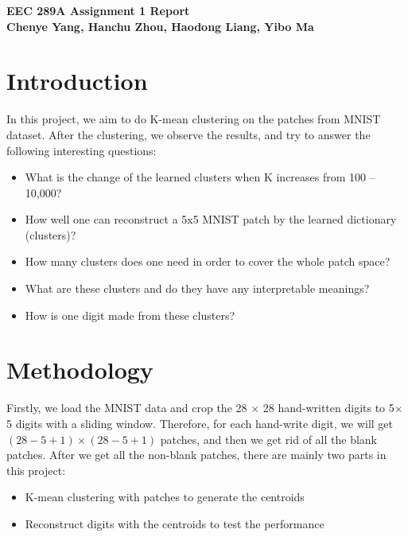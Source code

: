 \documentclass{article}
\begin{document}
\noindent
\textbf{\large EEC 289A Assignment 1 Report} \\
\textbf{\small Chenye Yang, Hanchu Zhou, Haodong Liang, Yibo Ma}


\vspace{2mm}

\section{Introduction}

In this project, we aim to do K-mean clustering on the patches from MNIST dataset. After the clustering, we observe the results, and try to answer the following interesting questions:

\begin{itemize}
    \item What is the change of the learned clusters when K increases from 100 – 10,000?
    \item How well one can reconstruct a 5x5 MNIST patch by the learned dictionary (clusters)?
    \item How many clusters does one need in order to cover the whole patch space?
    \item What are these clusters and do they have any interpretable meanings?
    \item How is one digit made from these clusters?
\end{itemize}

\vspace{2mm}

\section{Methodology}

Firstly, we load the MNIST data and crop the 28 $\times$ 28 hand-written digits to 5$\times$ 5 digits with a sliding window. Therefore, for each hand-write digit, we will get $(28 -5 +1) \times (28 - 5 + 1)$ patches, and then we get rid of all the blank patches. After we get all the non-blank patches, there are mainly two parts in this project:

\begin{itemize}
    \item K-mean clustering with patches to generate the centroids
    \item Reconstruct digits with the centroids to test the performance
\end{itemize}


\vspace{2mm}
\end{document}

